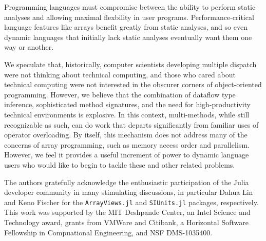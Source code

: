 \documentclass[preprint]{sigplanconf}
\newcommand{\code}[1]{\texttt{#1}}
\begin{document}
Programming languages must compromise between the ability to perform
static analyses and allowing maximal flexbility in user programs.
Performance-critical language features like arrays benefit greatly from
static analyses, and so even dynamic languages that initially lack static
analyses eventually want them one way or another.

We speculate that, historically, computer scientists developing multiple 
dispatch were not thinking about technical computing, and those who cared
about technical computing were not interested in the obscurer corners of
object-oriented programming. However, we believe that the combination of
dataflow type inference, sophisticated method signatures, and the need for
high-productivity technical environments is explosive. In this context,
multi-methods, while still recognizable as such, can do work that departs
significantly from familiar uses of operator overloading. By itself, this
mechanism does not address many of the concerns of array programming, such
as memory access order and parallelism. However, we feel it provides a
useful increment of power to dynamic language users who would like to begin
to tackle these and other related problems.


%

\acks

The authors gratefully acknowledge the enthusiastic participation of the Julia
developer community in many stimulating discussions, in particular Dahua Lin and
Keno Fischer for the \code{ArrayViews.jl}\cite{Lin:2014av} and
\code{SIUnits.jl}\cite{Fischer:2014si} packages, respectively. This
work was supported by the MIT Deshpande Center, an Intel Science and
Technology award, grants from VMWare and Citibank, a Horizontal Software
Fellowship in Compuational Engineering, and NSF DMS-1035400.
\end{document}
